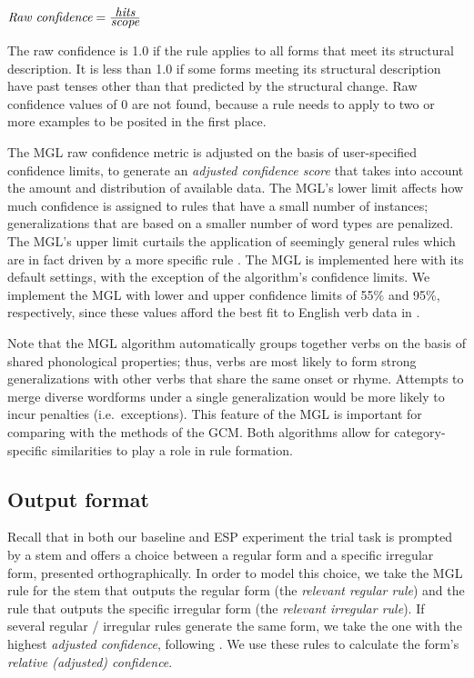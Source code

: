 \documentclass[12pt]{article}
\begin{document}
\vspace{1cm}
$\mbox{\it Raw confidence} = \frac{\mbox{\it  hits}} {\mbox{\it  scope}}$
\vspace{1cm}

The raw confidence is 1.0 if the rule applies to all forms that meet its structural description.  It is less than 1.0 if some forms meeting its structural description have past tenses other than that predicted by the structural change. Raw confidence values of 0 are not found, because a rule needs to apply to two or more examples to be posited in the first place.

The MGL raw confidence metric is adjusted on the basis of user-specified confidence limits, to generate an {\em adjusted confidence score} that takes into account the amount and distribution of available data. The MGL's lower limit affects how much confidence is assigned to rules that have a small number of instances; generalizations that are based on a smaller number of word types are penalized. The MGL's upper limit curtails the application of seemingly general rules which are in fact driven by a more specific rule \citep{albright2002modeling}. The MGL is implemented here with its default settings, with the exception of the algorithm's confidence limits. We implement the MGL with lower and upper confidence limits of 55\% and 95\%, respectively, since these values afford the best fit to English verb data in \cite{albright2003rules}.

Note that the MGL algorithm automatically groups together verbs on the basis of shared phonological properties; thus, verbs are most likely to form strong generalizations with other verbs that share the same onset or rhyme. Attempts to merge diverse wordforms under a single generalization would be more likely to incur penalties (i.e.\ exceptions). This feature of the MGL is important for comparing with the methods of the GCM. Both algorithms allow for category-specific similarities to play a role in rule formation.

\subsection{Output format}\label{mgloutput}

Recall that in both our baseline and ESP experiment the trial task is prompted by a stem and offers a choice between a regular form and a specific irregular form, presented orthographically. In order to model this choice, we take the MGL rule for the stem that outputs the regular form (the {\em relevant regular rule}) and the rule that outputs the specific irregular form (the {\em relevant irregular rule}). If several regular / irregular rules generate the same form, we take the one with the highest {\em adjusted confidence}, following \cite{albright2003rules}. We use these rules to calculate the form's {\em relative (adjusted) confidence}.
\end{document}

